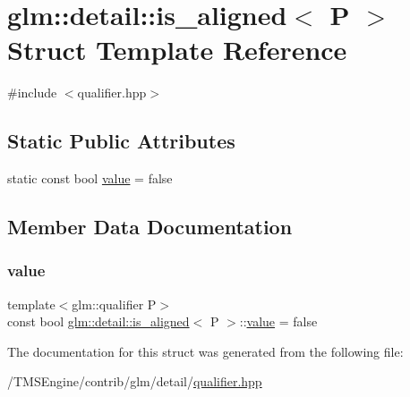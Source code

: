 \hypertarget{structglm_1_1detail_1_1is__aligned}{}\section{glm\+:\+:detail\+:\+:is\+\_\+aligned$<$ P $>$ Struct Template Reference}
\label{structglm_1_1detail_1_1is__aligned}


{\ttfamily \#include $<$qualifier.\+hpp$>$}

\subsection*{Static Public Attributes}
\begin{DoxyCompactItemize}
\item 
static const bool \hyperlink{structglm_1_1detail_1_1is__aligned_ac46592cb8bac0221314181e0143aa265}{value} = false
\end{DoxyCompactItemize}


\subsection{Member Data Documentation}
\mbox{\label{structglm_1_1detail_1_1is__aligned_ac46592cb8bac0221314181e0143aa265}} 
\subsubsection{\texorpdfstring{value}{value}}
{\footnotesize\ttfamily template$<$glm\+::qualifier P$>$ \\
const bool \hyperlink{structglm_1_1detail_1_1is__aligned}{glm\+::detail\+::is\+\_\+aligned}$<$ P $>$\+::\hyperlink{_s_d_l__opengl__glext_8h_a8ad81492d410ff2ac11f754f4042150f}{value} = false\hspace{0.3cm}{\ttfamily [static]}}



The documentation for this struct was generated from the following file\+:\begin{DoxyCompactItemize}
\item 
/\+T\+M\+S\+Engine/contrib/glm/detail/\hyperlink{qualifier_8hpp}{qualifier.\+hpp}\end{DoxyCompactItemize}
